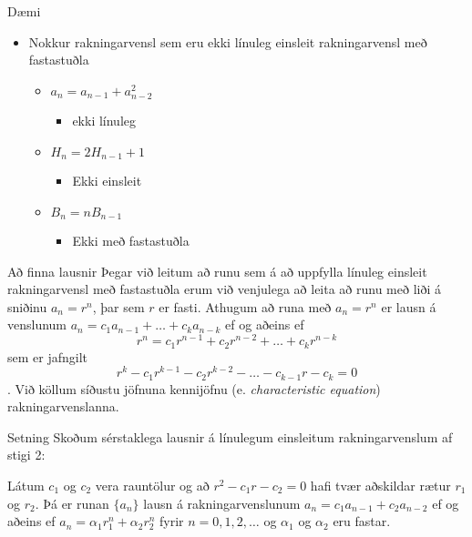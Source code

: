 \documentclass[handout]{beamer}
\begin{document}
\begin{frame}{Dæmi}
\begin{itemize}
 \item Nokkur rakningarvensl sem eru ekki línuleg einsleit rakningarvensl með fastastuðla
 \begin{itemize}[<+->]
  \item $a_n = a_{n-1} + a_{n-2}^2$
  \begin{itemize}
   \item ekki línuleg
  \end{itemize}
  \item $H_n = 2H_{n-1} + 1$
  \begin{itemize}
   \item Ekki einsleit
  \end{itemize}
  \item $B_n = nB_{n-1}$
  \begin{itemize}
   \item Ekki með fastastuðla
  \end{itemize}
 \end{itemize}
\end{itemize}
\end{frame}

\begin{frame}{Að finna lausnir}
Þegar við leitum að runu sem á að uppfylla línuleg einsleit rakningarvensl með fastastuðla erum við venjulega að leita að runu með liði á sniðinu $a_n = r^n$, þar sem $r$ er fasti. Athugum að runa með $a_n = r^n$ er lausn á venslunum $ a_n = c_1 a_{n-1} + \ldots + c_ka_{n-k}$ ef og aðeins ef
\[
 r^n = c_1r^{n-1} + c_2r^{n-2} + \ldots + c_kr^{n-k}
\]
sem er jafngilt
\[
 r^k - c_1r^{k-1} - c_2r^{k-2} - \ldots - c_{k-1}r - c_k = 0
\]
. Við köllum síðustu jöfnuna kennijöfnu (e. \emph{characteristic equation}) rakningarvenslanna.
\end{frame}

\begin{frame}{Setning}
Skoðum sérstaklega lausnir á línulegum einsleitum rakningarvenslum af stigi 2:
\begin{tcolorbox}[title=Lausn einfaldra rakningarvensla af stigi 2]
Látum $c_1$ og $c_2$ vera rauntölur og að $r^2 - c_1r - c_2 = 0$ hafi tvær aðskildar rætur $r_1$ og $r_2$. Þá er runan $\{a_n\}$ lausn á rakningarvenslunum $a_n = c_1a_{n-1} + c_2a_{n-2}$ ef og aðeins ef $a_n = \alpha_1r_1^n + \alpha_2r^n_2$ fyrir $n=0,1,2,\ldots$ og $\alpha_1$ og $\alpha_2$ eru fastar.
\end{tcolorbox}

\end{frame}
\end{document}
